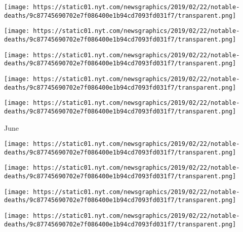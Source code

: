 \texttt{[image: https://static01.nyt.com/newsgraphics/2019/02/22/notable-deaths/9c87745690702e7f086400e1b94cd7093fd031f7/transparent.png]}

\href{https://www.nytimes.com/2019/07/05/movies/paul-benjamin-dead.html}{}

\texttt{[image: https://static01.nyt.com/newsgraphics/2019/02/22/notable-deaths/9c87745690702e7f086400e1b94cd7093fd031f7/transparent.png]}

\href{https://www.nytimes.com/2019/07/03/arts/television/arte-johnson-dead.html}{}

\texttt{[image: https://static01.nyt.com/newsgraphics/2019/02/22/notable-deaths/9c87745690702e7f086400e1b94cd7093fd031f7/transparent.png]}

\href{https://www.nytimes.com/2019/07/02/obituaries/lee-iacocca-dead.html}{}

\texttt{[image: https://static01.nyt.com/newsgraphics/2019/02/22/notable-deaths/9c87745690702e7f086400e1b94cd7093fd031f7/transparent.png]}

\href{https://www.nytimes.com/2019/07/01/sports/baseball/tyler-skaggs-dead.html}{}

\texttt{[image: https://static01.nyt.com/newsgraphics/2019/02/22/notable-deaths/9c87745690702e7f086400e1b94cd7093fd031f7/transparent.png]}

June

\href{https://www.nytimes.com/2019/06/29/obituaries/luis-alvarez-dead.html}{}

\texttt{[image: https://static01.nyt.com/newsgraphics/2019/02/22/notable-deaths/9c87745690702e7f086400e1b94cd7093fd031f7/transparent.png]}

\href{https://www.nytimes.com/2019/06/28/obituaries/min-hogg-dead.html}{}

\texttt{[image: https://static01.nyt.com/newsgraphics/2019/02/22/notable-deaths/9c87745690702e7f086400e1b94cd7093fd031f7/transparent.png]}

\href{https://www.nytimes.com/2019/06/28/movies/isabel-sarli-dead.html}{}

\texttt{[image: https://static01.nyt.com/newsgraphics/2019/02/22/notable-deaths/9c87745690702e7f086400e1b94cd7093fd031f7/transparent.png]}

\href{https://www.nytimes.com/2019/06/27/arts/john-shearer-dead.html}{}

\texttt{[image: https://static01.nyt.com/newsgraphics/2019/02/22/notable-deaths/9c87745690702e7f086400e1b94cd7093fd031f7/transparent.png]}

